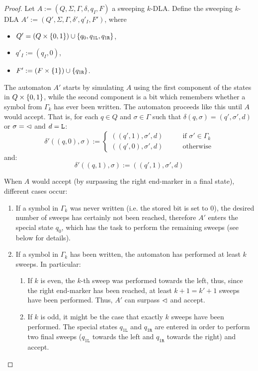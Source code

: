 \begin{proof}
	\newcommand{\ql}{q_{1\mathtt{L}}}
	\newcommand{\qr}{q_{1\mathtt{R}}}

	Let $A:=(Q,\Sigma,\Gamma,\delta,q_I,F)$ a sweeping $k$-DLA.
	Define the sweeping $k$-DLA $A':=(Q',\Sigma,\Gamma,\delta',q'_I,F')$, where
	\begin{itemize}
		\item $Q'=(Q\times\set{0,1})\cup\set{q_0,\ql,\qr}$,
		\item $q'_I:=(q_I,0)$,
		\item $F':=(F\times\set{1})\cup\set{\qr}$.
	\end{itemize}

	The automaton $A'$ starts by simulating $A$ using the first component of the states in $Q\times\{0,1\}$, while the second component is a bit which remembers whether a symbol from $\Gamma_k$ has ever been written.
	The automaton proceeds like this until $A$ would accept.
	That is, for each $q\in Q$ and $\sigma\in\Gamma$ such that $\delta(q,\sigma)=(q',\sigma',d)$ or $\sigma=\lhd$ and $d=\mathtt L$:
	\begin{equation*}
		\delta'((q,0),\sigma):=\begin{cases}
			((q',1),\sigma',d) \qquad & \text{if }\sigma'\in\Gamma_k \\
			((q',0),\sigma',d) \qquad & \text{otherwise}
		\end{cases}
	\end{equation*}
	and:
	\begin{equation*}
		\delta'((q,1),\sigma):=((q',1),\sigma',d)
	\end{equation*}

	When $A$ would accept (by surpassing the right end-marker in a final state), different cases occur:
	\begin{enumerate}
		\item If a symbol in $\Gamma_k$ was never written (i.e. the stored bit is set to $0$), the desired number of sweeps has certainly not been reached, therefore $A'$ enters the special state $q_0$, which has the task to perform the remaining sweeps (see below for details).
		\item If a symbol in $\Gamma_k$ has been written, the automaton has performed at least $k$ sweeps. In particular:
		      \begin{enumerate}
			      \item If $k$ is even, the $k$-th sweep was performed towards the left, thus, since the right end-marker has been reached, at least $k+1=k'+1$ sweeps have been performed. Thus, $A'$ can surpass $\lhd$ and accept.
			      \item If $k$ is odd, it might be the case that exactly $k$ sweeps have been performed. The special states $\ql$ and $\qr$ are entered in order to perform two final sweeps ($\ql$ towards the left and $\qr$ towards the right) and accept.
		      \end{enumerate}
	\end{enumerate}


\end{proof}
